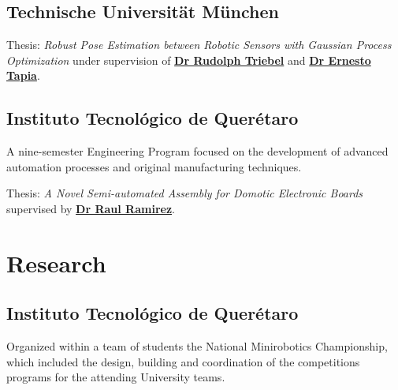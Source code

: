 \documentclass[a4paper]{mario01}
\begin{document}
\begin{minipage}[t]{0.7\textwidth}
		\subsection{Technische Universit\"{a}t M\"{u}nchen}
			\begin{tightitemize}
				\item Thesis: \textit{Robust Pose Estimation between Robotic Sensors with Gaussian Process Optimization} under supervision of \textbf{\href{http://vision.in.tum.de/members/triebel}{Dr Rudolph Triebel}} and \textbf{\href{http://userpage.fu-berlin.de/~tapia/}{Dr Ernesto Tapia}}.
			\end{tightitemize}
		
		\sectionspace %
		
		\subsection{Instituto Tecnol\'{o}gico de Quer\'{e}taro}
			\begin{tightitemize}
				\item A nine-semester Engineering Program focused on the development of advanced automation processes and original manufacturing techniques.
				\item Thesis: \textit{A Novel Semi-automated Assembly for Domotic Electronic Boards} supervised by \textbf{\href{http://www.researchgate.net/profile/Raul_Lopez21}{Dr Raul Ramirez}}.
			\end{tightitemize}
			
		\sectionspace %
	\section{Research}
		\subsection{Instituto Tecnol\'{o}gico de Quer\'{e}taro}
		Organized within a team of students the National Minirobotics Championship, which included the design, building and coordination of the competitions programs for the attending University teams.
		

\end{minipage}
\end{document}

